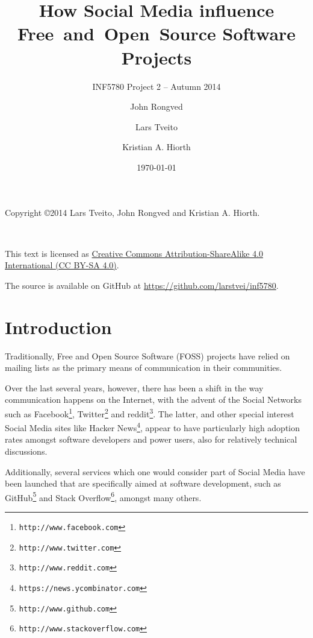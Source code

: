 \documentclass[a4paper,11pt]{article} %
\title{How Social Media influence \hbox{Free and Open Source} Software Projects}
\subtitle{INF5780 Project 2 -- Autumn 2014}
\date{\today}
\author{John Rongved\and Lars Tveito\and Kristian A. Hiorth}
\begin{document}
\ififorside{}

\tableofcontents{}

\vspace{\fill}

\begin{center}
Copyright \copyright 2014 Lars Tveito, John Rongved and Kristian
A. Hiorth.

\ccLogo ~~ \ccAttribution ~~ \ccShareAlike

This text is licensed as \href{http://creativecommons.org/licenses/by-sa/4.0/}{Creative Commons
Attribution-ShareAlike 4.0 International (CC BY-SA 4.0)}.

The source is available on GitHub at
\url{https://github.com/larstvei/inf5780}.

\end{center}
\newpage

\section{Introduction}

Traditionally, Free and Open Source Software (FOSS) projects have
relied on mailing lists as the primary means of communication in
their communities. %

Over the last several years, however, there has been a shift in the way
communication happens on the Internet, with the advent of the Social
Networks such as Facebook\footnote{\texttt{http://www.facebook.com}}, Twitter\footnote{\texttt{http://www.twitter.com}} and reddit\footnote{\texttt{http://www.reddit.com}}.
The latter, and other special
interest Social Media sites like Hacker News\footnote{\texttt{https://news.ycombinator.com}}, appear to have particularly
high adoption rates amongst software developers and power users, also for
relatively technical discussions.

Additionally, several services which one would consider part of Social Media
have been launched that are specifically aimed at software development, such
as GitHub\footnote{\texttt{http://www.github.com}} and Stack Overflow\footnote{\texttt{http://www.stackoverflow.com}}, amongst many others.
\end{document}
